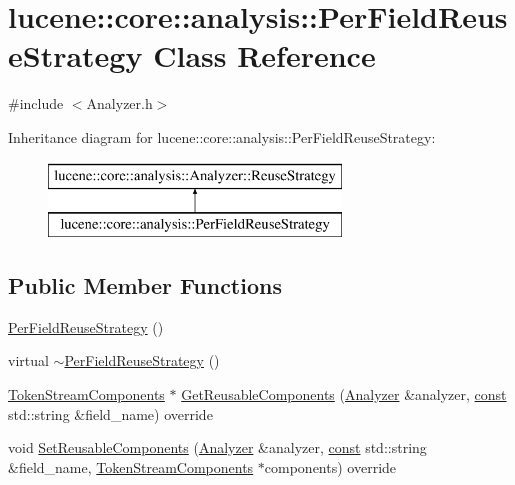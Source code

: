\hypertarget{classlucene_1_1core_1_1analysis_1_1PerFieldReuseStrategy}{}\section{lucene\+:\+:core\+:\+:analysis\+:\+:Per\+Field\+Reuse\+Strategy Class Reference}
\label{classlucene_1_1core_1_1analysis_1_1PerFieldReuseStrategy}


{\ttfamily \#include $<$Analyzer.\+h$>$}

Inheritance diagram for lucene\+:\+:core\+:\+:analysis\+:\+:Per\+Field\+Reuse\+Strategy\+:\begin{figure}[H]
\begin{center}
\leavevmode
\includegraphics[height=2.000000cm]{classlucene_1_1core_1_1analysis_1_1PerFieldReuseStrategy}
\end{center}
\end{figure}
\subsection*{Public Member Functions}
\begin{DoxyCompactItemize}
\item 
\mbox{\hyperlink{classlucene_1_1core_1_1analysis_1_1PerFieldReuseStrategy_ab2081194878f10803b28ff228db7327c}{Per\+Field\+Reuse\+Strategy}} ()
\item 
virtual \mbox{\hyperlink{classlucene_1_1core_1_1analysis_1_1PerFieldReuseStrategy_ab5af1cea75460e48364696c8a89bdbeb}{$\sim$\+Per\+Field\+Reuse\+Strategy}} ()
\item 
\mbox{\hyperlink{classlucene_1_1core_1_1analysis_1_1TokenStreamComponents}{Token\+Stream\+Components}} $\ast$ \mbox{\hyperlink{classlucene_1_1core_1_1analysis_1_1PerFieldReuseStrategy_ab0d86155823842bb28e43bbbec7c06d3}{Get\+Reusable\+Components}} (\mbox{\hyperlink{classlucene_1_1core_1_1analysis_1_1Analyzer}{Analyzer}} \&analyzer, \mbox{\hyperlink{ZlibCrc32_8h_a2c212835823e3c54a8ab6d95c652660e}{const}} std\+::string \&field\+\_\+name) override
\item 
void \mbox{\hyperlink{classlucene_1_1core_1_1analysis_1_1PerFieldReuseStrategy_ab23b95640469c639fd36ac888eeda1c3}{Set\+Reusable\+Components}} (\mbox{\hyperlink{classlucene_1_1core_1_1analysis_1_1Analyzer}{Analyzer}} \&analyzer, \mbox{\hyperlink{ZlibCrc32_8h_a2c212835823e3c54a8ab6d95c652660e}{const}} std\+::string \&field\+\_\+name, \mbox{\hyperlink{classlucene_1_1core_1_1analysis_1_1TokenStreamComponents}{Token\+Stream\+Components}} $\ast$components) override
\end{DoxyCompactItemize}
